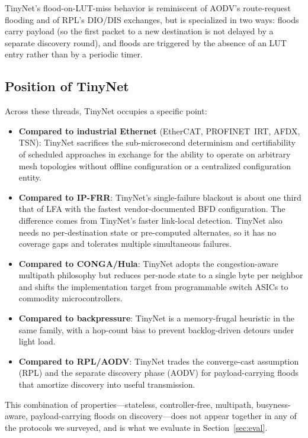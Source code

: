 TinyNet's flood-on-LUT-miss behavior is reminiscent of AODV's route-request flooding and of RPL's DIO/DIS exchanges, but is specialized in two ways: floods carry payload (so the first packet to a new destination is not delayed by a separate discovery round), and floods are triggered by the absence of an LUT entry rather than by a periodic timer.
 
\subsection{Position of TinyNet}
\label{sec:related:position}
 
Across these threads, TinyNet occupies a specific point:
\begin{itemize}
  \item \textbf{Compared to industrial Ethernet} (EtherCAT, PROFINET~IRT, AFDX, TSN): TinyNet sacrifices the sub-microsecond determinism and certifiability of scheduled approaches in exchange for the ability to operate on arbitrary mesh topologies without offline configuration or a centralized configuration entity.
  \item \textbf{Compared to IP-FRR}: TinyNet's single-failure blackout is about one third that of LFA with the fastest vendor-documented BFD configuration. The difference comes from TinyNet's faster link-local detection. TinyNet also needs no per-destination state or pre-computed alternates, so it has no coverage gaps and tolerates multiple simultaneous failures.
  \item \textbf{Compared to CONGA/Hula}: TinyNet adopts the congestion-aware multipath philosophy but reduces per-node state to a single byte per neighbor and shifts the implementation target from programmable switch ASICs to commodity microcontrollers.
  \item \textbf{Compared to backpressure}: TinyNet is a memory-frugal heuristic in the same family, with a hop-count bias to prevent backlog-driven detours under light load.
  \item \textbf{Compared to RPL/AODV}: TinyNet trades the converge-cast assumption (RPL) and the separate discovery phase (AODV) for payload-carrying floods that amortize discovery into useful transmission.
\end{itemize}
 
This combination of properties---stateless, controller-free,
multipath, busyness-aware, payload-carrying floods on
discovery---does not appear together in any of the protocols we surveyed,
and is what we evaluate in Section~\ref{sec:eval}.